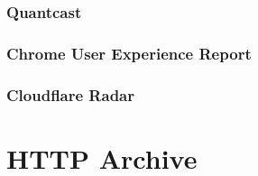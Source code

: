 {\subsubsection{Quantcast}

\subsubsection{Chrome User Experience Report}

\subsubsection{Cloudflare Radar}




\section{HTTP Archive}

}
